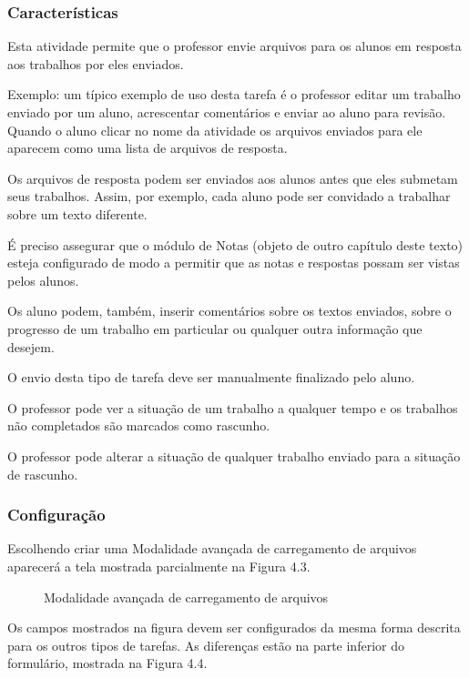 \subsubsection{Características}

Esta atividade permite que o professor envie arquivos para os alunos em resposta aos trabalhos por eles enviados.

Exemplo: um típico exemplo de uso desta tarefa é o professor editar um trabalho enviado por um aluno, acrescentar comentários e enviar ao aluno para revisão. Quando o aluno clicar no nome da atividade os arquivos enviados para ele aparecem como uma lista de arquivos de resposta.

Os arquivos de resposta podem ser enviados aos alunos antes que eles submetam seus trabalhos. Assim, por exemplo, cada aluno pode ser convidado a trabalhar sobre um texto diferente.

É preciso assegurar que o módulo de Notas (objeto de outro capítulo deste texto) esteja configurado de modo a permitir que as notas e respostas possam ser vistas pelos alunos.

Os aluno podem, também, inserir comentários sobre os textos enviados, sobre o progresso de um trabalho em particular ou qualquer outra informação que desejem.

O envio desta tipo de tarefa deve ser manualmente finalizado pelo aluno.

O professor pode ver a situação de um trabalho a qualquer tempo e os trabalhos não completados são marcados como rascunho.

O professor pode alterar a situação de qualquer trabalho enviado para a situação de rascunho.

\subsubsection{Configuração}

Escolhendo criar uma Modalidade avançada de carregamento de arquivos aparecerá a tela mostrada parcialmente na Figura 4.3.

\begin{figure}
 \begin{center}
  \caption{Modalidade avançada de carregamento de arquivos}
 \end{center}
\end{figure}

Os campos mostrados na figura devem ser configurados da mesma forma descrita para os outros tipos de tarefas. As diferenças estão na parte inferior do formulário, mostrada na Figura 4.4.

